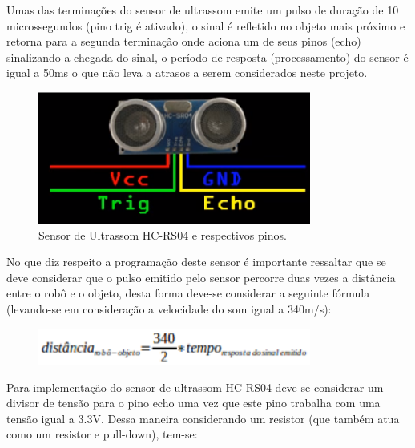 Umas das terminações do sensor de ultrassom emite um pulso de duração de 10 microssegundos (pino trig é ativado), o sinal é refletido no objeto mais próximo e retorna para a segunda terminação onde aciona um de seus pinos (echo) sinalizando a chegada do sinal, o período de resposta (processamento) do sensor é igual a 50ms o que não leva a atrasos a serem considerados neste projeto. 

\begin{figure}[H]
    \centering
    \includegraphics[width=0.8\textwidth]{figuras/pinos_ultrassom.eps}
    \caption{Sensor de Ultrassom HC-RS04 e respectivos pinos.}
    \label{fig:catia01}
\end{figure}

No que diz respeito a programação deste sensor é importante ressaltar que se deve considerar que o pulso emitido pelo sensor percorre duas vezes a distância entre o robô e o objeto, desta forma deve-se considerar a seguinte fórmula (levando-se em consideração a velocidade do som igual a 340m/s):

\begin{figure}[H]
    \centering
    \includegraphics[width=0.8\textwidth]{figuras/distancia.eps}
    \caption{}
    \label{fig:catia01}
\end{figure}

Para implementação do sensor de ultrassom HC-RS04 deve-se considerar um divisor de tensão para o pino echo uma vez que este pino trabalha com uma tensão igual a 3.3V. Dessa maneira considerando um resistor  (que também atua como um resistor e pull-down), tem-se:

